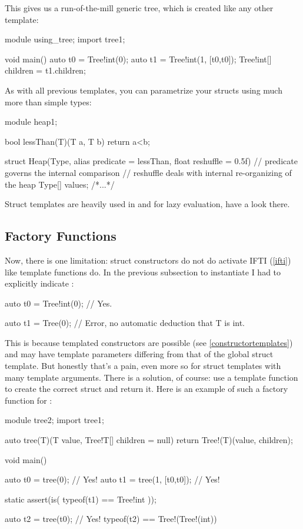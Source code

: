 This gives us a run-of-the-mill generic tree, which is created like any other template:

\begin{dcode}
module using_tree;
import tree1;

void main()
{
    auto t0 = Tree!int(0);
    auto t1 = Tree!int(1, [t0,t0]);
    Tree!int[] children = t1.children;
}
\end{dcode}

As with all previous templates, you can parametrize your structs using much more than simple types:

\begin{dcode}
module heap1;

bool lessThan(T)(T a, T b) { return a<b;}

struct Heap(Type, alias predicate = lessThan, float reshuffle = 0.5f)
{
    // predicate governs the internal comparison
    // reshuffle deals with internal re-organizing of the heap
    Type[] values;
/*...*/
}
\end{dcode}

Struct templates are heavily used in  and  for lazy evaluation, have a look there.

\subsection{Factory Functions}\label{factory}

Now, there is one limitation: struct constructors do not do activate IFTI (\ref{ifti}) like template functions do. In the previous subsection to instantiate  I had to explicitly indicate :

\begin{dcode}
auto t0 = Tree!int(0); // Yes.

auto t1 = Tree(0); // Error, no automatic deduction that T is int.
\end{dcode}

This is because templated constructors are possible (see \ref{constructortemplates}) and may have template parameters differing from that of the global struct template. But honestly that's a pain, even more so for struct templates with many template arguments. There is a solution, of course: use a template function to create the correct struct and return it. Here is an example of such a factory function for :

\begin{dcode}
module tree2;
import tree1;

auto tree(T)(T value, Tree!T[] children = null) 
{
    return Tree!(T)(value, children);
}

void main()
{
    auto t0 = tree(0); // Yes!
    auto t1 = tree(1, [t0,t0]); // Yes!

    static assert(is( typeof(t1) == Tree!int ));

    auto t2 = tree(t0); // Yes! typeof(t2) == Tree!(Tree!(int))
}
\end{dcode}

